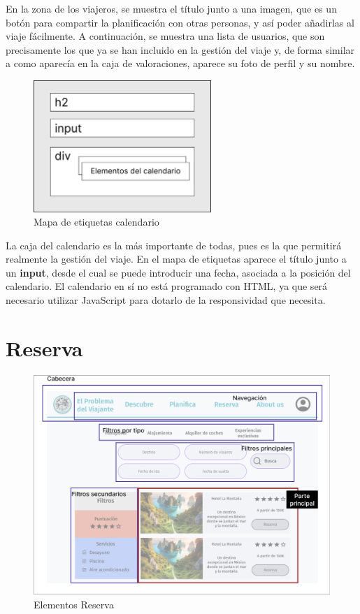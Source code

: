 \documentclass[11pt, a4paper]{book}
\begin{document}
	En la zona de los viajeros, se muestra el título junto a una imagen, que es un botón para compartir la planificación con otras personas, y así poder añadirlas al viaje fácilmente. A continuación, se muestra una lista de usuarios, que son precisamente los que ya se han incluido en la gestión del viaje y, de forma similar a como aparecía en la caja de valoraciones, aparece su foto de perfil y su nombre.

	\begin{figure} [H]
		\centering
		\includegraphics[width=0.6\textwidth]{HTML/Etiq-calendario.jpg}
		\caption{Mapa de etiquetas calendario}
	\end{figure}

	La caja del calendario es la más importante de todas, pues es la que permitirá realmente la gestión del viaje. En el mapa de etiquetas aparece el título junto a un \textbf{input}, desde el cual se puede introducir una fecha, asociada a la posición del calendario. El calendario en sí no está programado con HTML, ya que será necesario utilizar JavaScript para dotarlo de la responsividad que necesita.

    \section{Reserva}

	\begin{figure} [H]
		\centering
		\includegraphics[width=\textwidth]{HTML/Doc-reserva.jpg}
		\caption{Elementos Reserva}
	\end{figure}
\end{document}
